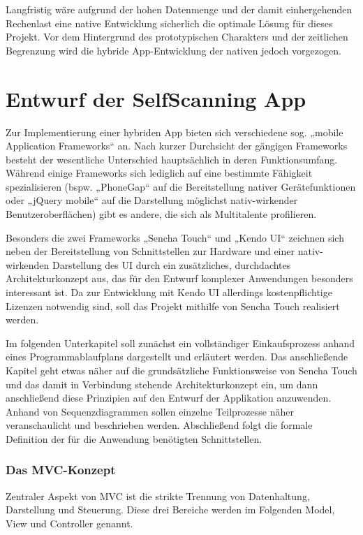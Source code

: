 Langfristig wäre aufgrund der hohen Datenmenge und der damit einhergehenden Rechenlast eine native Entwicklung sicherlich die optimale Lösung für dieses Projekt. Vor dem Hintergrund des prototypischen Charakters und der zeitlichen Begrenzung wird die hybride App-Entwicklung der nativen jedoch vorgezogen.

\chapter{Entwurf der SelfScanning App}
Zur Implementierung einer hybriden App bieten sich verschiedene sog. „mobile Application Frameworks“ an. Nach kurzer Durchsicht der gängigen Frameworks besteht der wesentliche Unterschied hauptsächlich in deren Funktionsumfang. Während einige Frameworks sich lediglich auf eine bestimmte Fähigkeit spezialisieren (bspw. „PhoneGap“ auf die Bereitstellung nativer Gerätefunktionen oder „jQuery mobile“ auf die Darstellung möglichst nativ-wirkender Benutzeroberflächen) gibt es andere, die sich als Multitalente profilieren. 

Besonders die zwei Frameworks „Sencha Touch“ und „Kendo UI“ zeichnen sich neben der Bereitstellung von Schnittstellen zur Hardware und einer nativ-wirkenden Darstellung des UI durch ein zusätzliches, durchdachtes Architekturkonzept aus, das für den Entwurf komplexer Anwendungen besonders interessant ist. Da zur Entwicklung mit Kendo UI allerdings kostenpflichtige Lizenzen notwendig sind, soll das Projekt mithilfe von Sencha Touch realisiert werden.

Im folgenden Unterkapitel soll zunächst ein vollständiger Einkaufsprozess anhand eines Programmablaufplans dargestellt und erläutert werden. Das anschließende Kapitel geht etwas näher auf die grundsätzliche Funktionsweise von Sencha Touch und das damit in Verbindung stehende Architekturkonzept ein, um dann anschließend diese Prinzipien auf den Entwurf der Applikation anzuwenden. Anhand von Sequenzdiagrammen sollen einzelne Teilprozesse näher veranschaulicht und beschrieben werden. Abschließend folgt die formale Definition der für die Anwendung benötigten Schnittstellen.


\subsection{Das MVC-Konzept}
Zentraler Aspekt von MVC ist die strikte Trennung von Datenhaltung, Darstellung und Steuerung. Diese drei Bereiche werden im Folgenden Model, View und Controller genannt.

